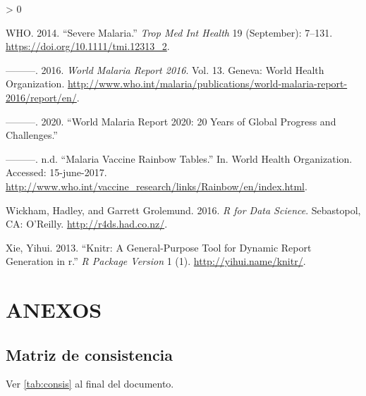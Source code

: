 \documentclass[
  a4paper]{article}
\newlength{\cslhangindent}
\newenvironment{CSLReferences}[2] %
 {%
  \setlength{\parindent}{0pt}
  \ifodd #1 \everypar{\setlength{\hangindent}{\cslhangindent}}\ignorespaces\fi
  \ifnum #2 > 0
  \setlength{\parskip}{#2\baselineskip}
  \fi
 }%
 {}
\begin{document}
\begin{CSLReferences}{1}{0}
\leavevmode\hypertarget{ref-WHO2014severe}{}%
WHO. 2014. {``Severe Malaria.''} \emph{Trop Med Int Health} 19
(September): 7--131. \url{https://doi.org/10.1111/tmi.12313_2}.

\leavevmode\hypertarget{ref-WHO2016world}{}%
---------. 2016. \emph{World Malaria Report 2016}. Vol. 13. Geneva:
World Health Organization.
\url{http://www.who.int/malaria/publications/world-malaria-report-2016/report/en/}.

\leavevmode\hypertarget{ref-world2020world}{}%
---------. 2020. {``World Malaria Report 2020: 20 Years of Global
Progress and Challenges.''}

\leavevmode\hypertarget{ref-rainbow2016}{}%
---------. n.d. {``Malaria Vaccine Rainbow Tables.''} In. World Health
Organization. Accessed: 15-june-2017.
\url{http://www.who.int/vaccine_research/links/Rainbow/en/index.html}.

\leavevmode\hypertarget{ref-wickham2016r4ds}{}%
Wickham, Hadley, and Garrett Grolemund. 2016. \emph{R for Data Science}.
Sebastopol, CA: O'Reilly. \url{http://r4ds.had.co.nz/}.

\leavevmode\hypertarget{ref-knitr}{}%
Xie, Yihui. 2013. {``Knitr: A General-Purpose Tool for Dynamic Report
Generation in r.''} \emph{R Package Version} 1 (1).
\url{http://yihui.name/knitr/}.

\end{CSLReferences}

\section{ANEXOS}\label{anexos}

\subsection{Matriz de consistencia}\label{matriz-de-consistencia}

Ver \autoref{tab:consis} al final del documento.
\end{document}
